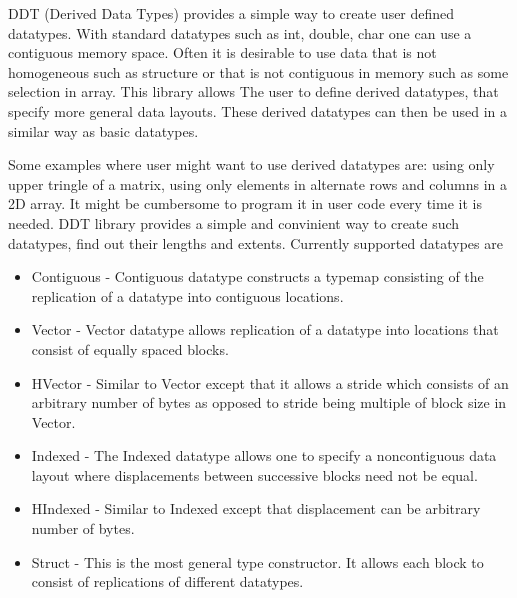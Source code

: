 DDT (Derived Data Types) provides a simple way to create user defined datatypes.
With standard datatypes such as int, double, char one can use a contiguous 
memory space. Often it is desirable to use data that is not homogeneous such 
as structure or that is not contiguous in memory such as some selection in 
array. This library allows The user to define derived datatypes, that specify 
more general data layouts. These derived datatypes can then be used in a 
similar way as basic datatypes.

Some examples where user might want to use derived datatypes are: using only 
upper tringle of a matrix, using only elements in alternate rows and columns 
in a 2D array.
It might be cumbersome to program it in user code every time it is needed. 
DDT library provides a simple and convinient way to create such datatypes, find out their lengths and extents.
\newline
Currently supported datatypes are 
\begin{itemize}
\item Contiguous - Contiguous datatype constructs a typemap consisting of the
replication of a datatype into contiguous locations. 
\item Vector - Vector datatype allows replication of a datatype into locations 
that consist of equally spaced blocks.
\item HVector - Similar to Vector except that it allows a stride which consists
of an arbitrary number of bytes as opposed to stride being multiple of block 
size in Vector.
\item Indexed - The Indexed datatype allows one to specify a noncontiguous data
layout where displacements between successive blocks need not be equal.
\item HIndexed - Similar to Indexed except that displacement can be arbitrary
number of bytes.
\item Struct - This is the most general type constructor. It allows each block
to consist of replications of different datatypes.
\end{itemize}

